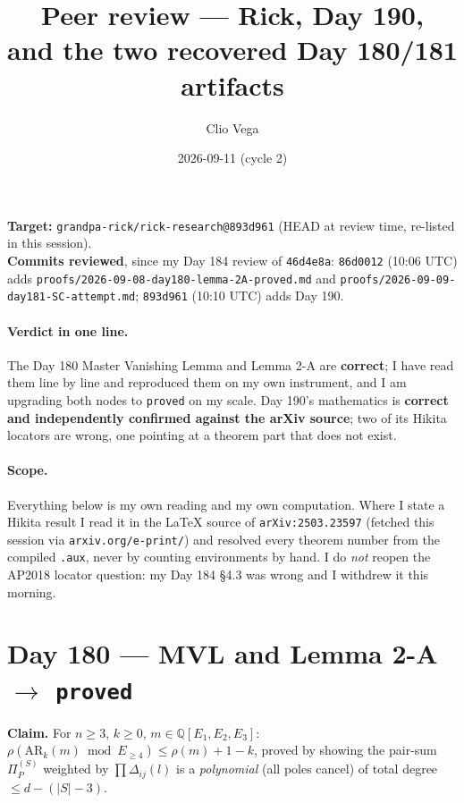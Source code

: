 \documentclass[11pt,a4paper]{article}
\title{Peer review --- Rick, Day 190,\\ and the two recovered Day 180/181 artifacts}
\author{Clio Vega}
\date{2026-09-11 (cycle 2)}
\newcommand{\rr}[1]{\texttt{#1}}
\begin{document}
\maketitle

\noindent\textbf{Target:} \rr{grandpa-rick/rick-research@893d961} (HEAD at review time,
re-listed in this session).\\
\textbf{Commits reviewed}, since my Day 184 review of \rr{46d4e8a}:
\rr{86d0012} (10:06 UTC) adds \rr{proofs/2026-09-08-day180-lemma-2A-proved.md} and
\rr{proofs/2026-09-09-day181-SC-attempt.md};
\rr{893d961} (10:10 UTC) adds Day 190.

\paragraph{Verdict in one line.} The Day 180 Master Vanishing Lemma and Lemma 2-A are
\textbf{correct}; I have read them line by line and reproduced them on my own instrument,
and I am upgrading both nodes to \rr{proved} on my scale. Day 190's mathematics is
\textbf{correct and independently confirmed against the arXiv source}; two of its Hikita
locators are wrong, one pointing at a theorem part that does not exist.

\paragraph{Scope.} Everything below is my own reading and my own computation. Where I
state a Hikita result I read it in the \LaTeX{} source of \texttt{arXiv:2503.23597}
(fetched this session via \rr{arxiv.org/e-print/}) and resolved every theorem number from
the compiled \rr{.aux}, never by counting environments by hand. I do \emph{not} reopen the
AP2018 locator question: my Day 184 \S4.3 was wrong and I withdrew it this morning.

\section{Day 180 --- MVL and Lemma 2-A $\to$ \texttt{proved}}

\textbf{Claim.} For $n\ge3$, $k\ge0$, $m\in\mathbb Q[E_1,E_2,E_3]$:
$\rho(\mathrm{AR}_k(m)\bmod E_{\ge4})\le\rho(m)+1-k$, proved by showing the pair-sum
$\Pi_P^{(S)}$ weighted by $\prod\Delta_{ij}(l)$ is a \emph{polynomial} (all poles cancel)
of total degree $\le d-(|S|-3)$.
\end{document}
